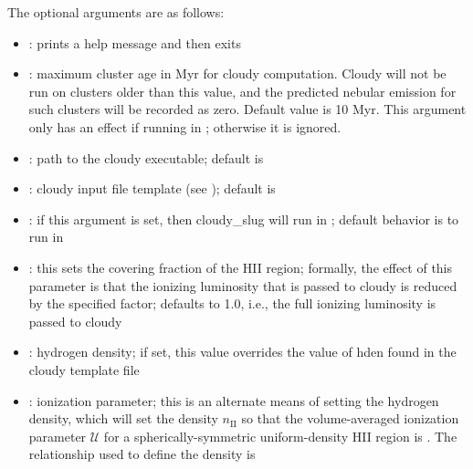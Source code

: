 \documentclass[letterpaper,10pt,english]{sphinxmanual}
\begin{document}
The optional arguments are as follows:
\begin{itemize}
\item {} 
: prints a help message and then exits

\item {} 
: maximum cluster age in Myr for
cloudy computation. Cloudy will not be run on clusters older than
this value, and the predicted nebular emission for such clusters
will be recorded as zero. Default value is 10 Myr. This argument only
has an effect if running in {\hyperref[cloudy:sssec-cloudy-cluster-mode]{\emph{}}};
otherwise it is ignored.

\item {} 
: path to the cloudy executable; default
is 

\item {} 
: cloudy input file template (see
{\hyperref[cloudy:ssec-cloudy-template]{\emph{}}}); default is

\item {} 
: if this argument is set, then cloudy\_slug
will run in {\hyperref[cloudy:sssec-cloudy-cluster-mode]{\emph{}}}; default behavior is to
run in {\hyperref[cloudy:sssec-cloudy-integrated-mode]{\emph{}}}

\item {} 
: this sets the
covering fraction of the HII region; formally, the effect of this
parameter is that the ionizing luminosity that is passed to cloudy
is reduced by the specified factor; defaults to 1.0, i.e., the full
ionizing luminosity is passed to cloudy

\item {} 
: hydrogen density; if set, this value
overrides the value of hden found in the cloudy template file

\item {} 
: ionization parameter; this is
an alternate means of setting the hydrogen density, which will set
the density \(n_{\mathrm{II}}\) so that the volume-averaged
ionization parameter \(\mathcal{U}\) for a spherically-symmetric
uniform-density HII region is . The relationship used to
define the density is

\end{itemize}
\end{document}
